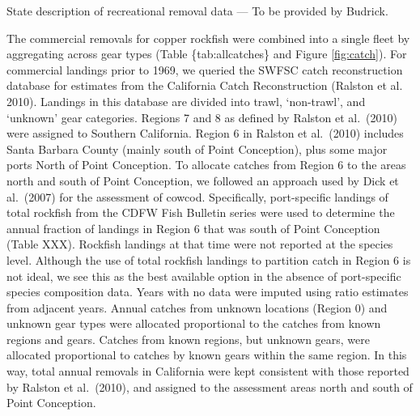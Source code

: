 \documentclass[11pt,
  english,
  a4paper,
]{article}
\begin{document}
State description of recreational removal data --- To be provided by Budrick.

\leavevmode\tagmcend\tagstructend\par


The commercial removals for copper rockfish were combined into a single fleet by aggregating across gear types (Table \{tab:allcatches\} and Figure \ref{fig:catch}). For commercial landings prior to 1969, we queried the SWFSC catch reconstruction database for estimates from the California Catch Reconstruction {(Ralston et al. 2010)\leavevmode\tagmcend\tagstructend}. Landings in this database are divided into trawl, `non-trawl', and `unknown' gear categories. Regions 7 and 8 as defined by Ralston et al.~{(2010)\leavevmode\tagmcend\tagstructend} were assigned to Southern California. Region 6 in Ralston et al.~{(2010)\leavevmode\tagmcend\tagstructend} includes Santa Barbara County (mainly south of Point Conception), plus some major ports North of Point Conception. To allocate catches from Region 6 to the areas north and south of Point Conception, we followed an approach used by Dick et al.~{(2007)\leavevmode\tagmcend\tagstructend} for the assessment of cowcod. Specifically, port-specific landings of total rockfish from the CDFW Fish Bulletin series were used to determine the annual fraction of landings in Region 6 that was south of Point Conception (Table XXX). Rockfish landings at that time were not reported at the species level. Although the use of total rockfish landings to partition catch in Region 6 is not ideal, we see this as the best available option in the absence of port-specific species composition data. Years with no data were imputed using ratio estimates from adjacent years. Annual catches from unknown locations (Region 0) and unknown gear types were allocated proportional to the catches from known regions and gears. Catches from known regions, but unknown gears, were allocated proportional to catches by known gears within the same region. In this way, total annual removals in California were kept consistent with those reported by Ralston et al.~{(2010)\leavevmode\tagmcend\tagstructend}, and assigned to the assessment areas north and south of Point Conception.
\end{document}
